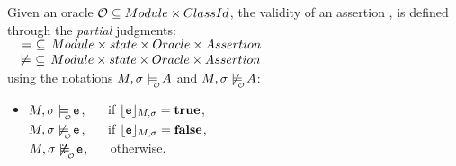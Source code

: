 \begin{definition} %
\label{def:one-state-assertion:valid}
Given an oracle ${\cal O} \subseteq Module \times ClassId$,   
the validity of an  assertion \syntax{\A}, is defined through the {\em partial} judgments:
$ ~ $
\\

\noindent
$ \  \ \ \models \ \subseteq \,  {Module} \times   {state} \times Oracle  \times  Assertion$
\\
$\strut \  \   \not\models \ \subseteq \,  {Module} \times   {state} \times Oracle  \times   Assertion 
$
\\

\noindent
using the notations  $\M,\sigma \modelsWithO \A$ and $\M,\sigma \not\modelsWithO \A$: \\


\begin{itemize}
 \item
 $\M,\sigma  \modelsWithO \syntax{\sE}$, \ \ \  if  ${\lfloor{ { {{{\ensuremath{\textrm{\ttfamily{e}}}}}}}}\rfloor_{M,\sigma}}={\bf {true}}$, \\
  {$\M,\sigma  \not\modelsWithO \syntax{\sE}$, \ \ \  if  ${\lfloor{ { {{{\ensuremath{\textrm{\ttfamily{e}}}}}}}}\rfloor_{M,\sigma}}={\bf {false}}$,\\
  $\M,\sigma  \not\modelsWithOQ \syntax{\sE}$, \ \ \ otherwise.}


\end{itemize}
\end{definition}
